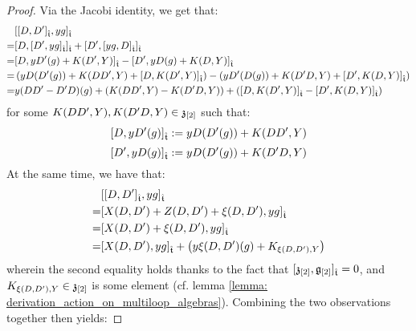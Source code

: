 \begin{proof}
                Via the Jacobi identity, we get that:
                    $$
                        \begin{aligned}
                            & [ [D, D']_{\hat{\mathfrak{t}}}, y g ]_{\hat{\mathfrak{t}}}
                            \\
                            = & [ D, [ D', y g ]_{\hat{\mathfrak{t}}} ]_{\hat{\mathfrak{t}}} + [ D', [ y g, D ]_{\hat{\mathfrak{t}}} ]_{\hat{\mathfrak{t}}}
                            \\
                            = & [ D, y D'( g ) + K(D', Y) ]_{\hat{\mathfrak{t}}} - [ D', y D( g ) + K(D, Y) ]_{\hat{\mathfrak{t}}}
                            \\
                            = & \left( y D( D'(g) ) + K(DD', Y) + [ D, K(D', Y) ]_{\hat{\mathfrak{t}}} \right) - \left( y D'( D(g) ) + K(D'D, Y) + [ D', K(D, Y) ]_{\hat{\mathfrak{t}}} \right)
                            \\
                            = & y (DD' - D'D)( g ) + ( K(DD', Y) - K(D'D, Y) ) + ( [ D, K(D', Y) ]_{\hat{\mathfrak{t}}} - [ D', K(D, Y) ]_{\hat{\mathfrak{t}}} )
                        \end{aligned}
                    $$
                for some $K(DD', Y), K(D'D, Y) \in \mathfrak{z}_{[2]}$ such that:
                    $$[ D, y D'( g ) ]_{\hat{\mathfrak{t}}} := y D( D'( g ) ) + K(DD', Y)$$
                    $$[ D', y D( g ) ]_{\hat{\mathfrak{t}}} := y D( D'( g ) ) + K(D'D, Y)$$
                At the same time, we have that:
                    $$
                        \begin{aligned}
                            & [ [D, D']_{\hat{\mathfrak{t}}}, y g ]_{\hat{\mathfrak{t}}}
                            \\
                            = & [ X(D, D') + Z(D, D') + \xi(D, D') , y g ]_{\hat{\mathfrak{t}}}
                            \\
                            = & [ X(D, D') + \xi(D, D') , y g ]_{\hat{\mathfrak{t}}}
                            \\
                            = & [ X(D, D') , y g ]_{\hat{\mathfrak{t}}} + \left( y \xi(D, D')(g) + K_{\xi(D, D'), Y} \right)
                        \end{aligned}
                    $$
                wherein the second equality holds thanks to the fact that $[\mathfrak{z}_{[2]}, \mathfrak{g}_{[2]}]_{\hat{\mathfrak{t}}} = 0$, and $K_{\xi(D, D'), Y} \in \mathfrak{z}_{[2]}$ is some element (cf. lemma \ref{lemma: derivation_action_on_multiloop_algebras}). Combining the two observations together then yields:

\end{proof}
